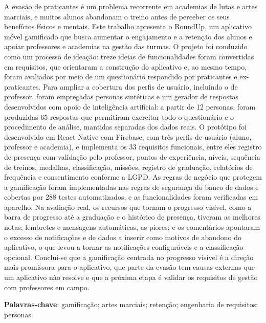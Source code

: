 \begin{resumo}
\SingleSpacing
\noindent A evasão de praticantes é um problema recorrente em academias de
lutas e artes marciais, e muitos alunos abandonam o treino antes de
perceber os seus benefícios físicos e mentais. Este trabalho apresenta o
RoundUp, um aplicativo móvel gamificado que busca aumentar o engajamento e
a retenção dos alunos e apoiar professores e academias na gestão das
turmas. O projeto foi conduzido como um processo de ideação: treze ideias
de funcionalidades foram convertidas em requisitos, que orientaram a
construção do aplicativo e, ao mesmo tempo, foram avaliados por meio de um
questionário respondido por praticantes e ex-praticantes. Para ampliar a
cobertura dos perfis de usuário, incluindo o de professor, foram
empregadas personas sintéticas e um gerador de respostas desenvolvidos
com apoio de inteligência artificial: a partir de 12 personas, foram
produzidas 65 respostas que permitiram exercitar todo o questionário e o
procedimento de análise, mantidas separadas dos dados reais. O protótipo foi desenvolvido em React
Native com Firebase, com três perfis de usuário (aluno, professor e
academia), e implementa os 33 requisitos funcionais, entre eles
registro de presença com validação pelo professor, pontos de experiência,
níveis, sequência de treinos, medalhas, classificação, missões, registro
de graduação, relatórios de frequência e consentimento conforme a LGPD. As
regras de negócio que protegem a gamificação foram implementadas nas
regras de segurança do banco de dados e cobertas por 288 testes
automatizados, e as funcionalidades foram verificadas em aparelho.
Na avaliação real, os recursos que tornam o progresso visível, como a
barra de progresso até a graduação e o histórico de presença, tiveram as
melhores notas; lembretes e mensagens automáticas, as piores; e os
comentários apontaram o excesso de notificações e de dados a inserir como
motivos de abandono do aplicativo, o que levou a tornar as notificações
configuráveis e a classificação opcional. Conclui-se que a gamificação
centrada no progresso visível é a direção mais promissora para o
aplicativo, que parte da evasão tem causas externas que um aplicativo não
resolve e que a próxima etapa é validar os requisitos de gestão com
professores em campo.

\vspace{\onelineskip}
\noindent\textbf{Palavras-chave}: gamificação; artes marciais; retenção; engenharia de requisitos; personas.
\end{resumo}
